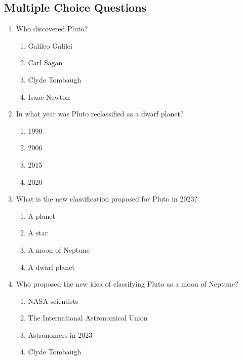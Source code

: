 \documentclass[12pt]{article}
\begin{document}
\subsection*{Multiple Choice Questions}

\begin{enumerate}

    \item Who discovered Pluto?

    \begin{enumerate}[label=\Alph*.]
        \item Galileo Galilei
        \item Carl Sagan
        \item Clyde Tombaugh
        \item Isaac Newton
    \end{enumerate}
    
    \vspace{0.5cm}

    \item In what year was Pluto reclassified as a dwarf planet?

    \begin{enumerate}[label=\Alph*.]
        \item 1990
        \item 2006
        \item 2015
        \item 2020
    \end{enumerate}
    
    \vspace{0.5cm}

    \item What is the new classification proposed for Pluto in 2023?

    \begin{enumerate}[label=\Alph*.]
        \item A planet
        \item A star
        \item A moon of Neptune
        \item A dwarf planet
    \end{enumerate}
    
    \vspace{0.5cm}

    \item Who proposed the new idea of classifying Pluto as a moon of Neptune?

    \begin{enumerate}[label=\Alph*.]
        \item NASA scientists
        \item The International Astronomical Union
        \item Astronomers in 2023
        \item Clyde Tombaugh
    \end{enumerate}
    

\end{enumerate}
\end{document}
